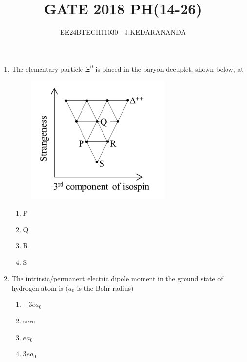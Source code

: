 \documentclass[journal]{IEEEtran}
\renewcommand{\thefigure}{\theenumi}
\renewcommand{\thetable}{\theenumi}
\numberwithin{equation}{enumi}
\numberwithin{figure}{enumi}
\renewcommand{\thetable}{\theenumi}
\begin{document}

\vspace{3cm}

\title{GATE 2018 PH(14-26)}
\author{EE24BTECH11030 - J.KEDARANANDA}
{\let\newpage\relax\maketitle}
\renewcommand{\thefigure}{\theenumi}
\renewcommand{\thetable}{\theenumi}
\begin{enumerate}
\item The elementary particle $\Xi^0$ is placed in the baryon decuplet, shown below, at
\begin{figure}[!ht]
    \centering
    \includegraphics[scale=0.4]{figs/fig1.png}
    \caption{}
    \label{fig:50,51}
\end{figure}
\begin{multicols}{2}
\begin{enumerate}
    \item P
    \item Q
    \item R
    \item S
\end{enumerate}
\end{multicols}

\bigskip

\item The intrinsic/permanent electric dipole moment in the ground state of hydrogen atom is $(a_0$ is the Bohr radius$)$
\begin{multicols}{2}
\begin{enumerate}
    \item $-3 e a_0$
    \item zero
    \item $e a_0$
    \item $3 e a_0$
\end{enumerate}
\end{multicols}


\end{enumerate}
\end{document}
